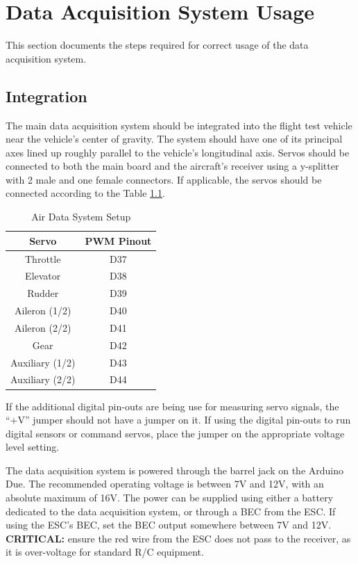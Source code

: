\chapter{Data Acquisition System Usage}
This section documents the steps required for correct usage of the data acquisition system.

\section{Integration}
The main data acquisition system should be integrated into the flight test vehicle near the vehicle's center of gravity. The system should have one of its principal axes lined up roughly parallel to the vehicle's longitudinal axis. Servos should be connected to both the main board and the aircraft's receiver using a y-splitter with 2 male and one female connectors. If applicable, the servos should be connected according to the Table \ref{table:servoSetup}.
\begin{table}[ht]
\caption{Air Data System Setup}
\centering
\begin{tabular}{c c}
\hline\hline
 Servo & PWM Pinout\\
\hline
Throttle & D37\\
Elevator & D38\\
Rudder & D39\\ 
Aileron (1/2) & D40\\
Aileron (2/2) & D41\\
Gear & D42\\
Auxiliary (1/2)& D43\\
Auxiliary (2/2)& D44\\
\hline
\end{tabular}
\label{table:servoSetup}
\end{table}

If the additional digital pin-outs are being use for measuring servo signals, the ``+V'' jumper should not have a jumper on it. If using the digital pin-outs to run digital sensors or command servos, place the jumper on the appropriate voltage level setting.

The data acquisition system is powered through the barrel jack on the Arduino Due. The recommended operating voltage is between 7V and 12V, with an absolute maximum of 16V. The power can be supplied using either a battery dedicated to the data acquisition system, or through a BEC from the ESC. If using the ESC's BEC, set the BEC output somewhere between 7V and 12V. \textbf{CRITICAL:} ensure the red wire from the ESC does not pass to the receiver, as it is over-voltage for standard R/C equipment.

